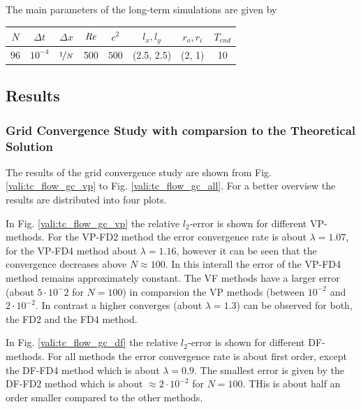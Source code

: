 The main parameters of the long-term simulations are  given by

\begin{center}
\vspace*{0.7ex}
\begin{tabular}{c|c|c|c|c|c|c|c }
 $ N  $                   & $\Delta t$ & $\Delta x$            & $\mbox{\textit{Re}}$  & $c^2$   & $l_x, l_y$ &$r_o, r_i$ & $T_{end}$\\
\hline
 $96 $& $10^{-4}$ & $\nicefrac{1}{N}$ & 500     & $500$   & (2.5, 2.5)  & (2, 1)    & 10\\
\end{tabular}
\vspace*{0.7ex}
\end{center}

\clearpage

\subsection{Results}

\subsubsection{Grid Convergence Study with comparsion to the Theoretical Solution}


The results of the grid convergence study are shown from Fig. \ref{vali:tc_flow_gc_vp} to Fig. \ref{vali:tc_flow_gc_all}.
For a better overview the results are distributed into four plots.

In Fig. \ref{vali:tc_flow_gc_vp} the relative $l_2$-error is shown for different VP-methods.
For the VP-FD2 method the error convergence rate is about $\lambda=1.07$,
for the VP-FD4 method about $\lambda=1.16$, however it can be seen that the convergence decreases above $N\approx100$.
In this interall the error of the VP-FD4 method remains approximately constant.
The VF methods have a larger error (about $5\cdot 10^-2$ for $N=100$) in comparsion the VP methods
(between $10^{-2}$ and $2\cdot10^{-2}$.
In contrast a higher converges (about $\lambda=1.3$) can be observed for both, the FD2 and the FD4 method.

In Fig. \ref{vali:tc_flow_gc_df} the relative $l_2$-error is shown for different DF-methods.
For all methods the error convergence rate is about first order, except the DF-FD4 method which is about $\lambda=0.9$.
The smallest error is given by the DF-FD2 method which is about $\approx 2 \cdot 10^{-2}$ for $N=100$.
THis is about half an order smaller compared to the other methods.

